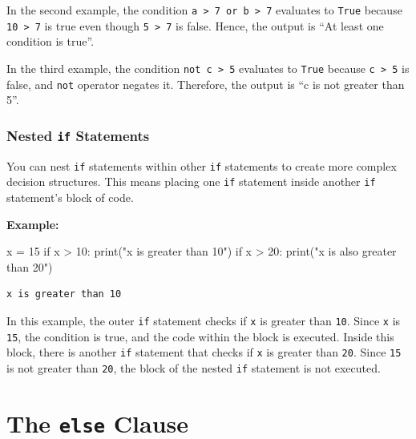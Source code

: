 \documentclass[
  letterpaper,
  DIV=11,
  numbers=noendperiod]{scrreprt}
\newenvironment{Shaded}{\begin{snugshade}}{\end{snugshade}}
\newcommand{\BuiltInTok}[1]{\textcolor[rgb]{0.00,0.23,0.31}{#1}}
\newcommand{\ControlFlowTok}[1]{\textcolor[rgb]{0.00,0.23,0.31}{#1}}
\newcommand{\DecValTok}[1]{\textcolor[rgb]{0.68,0.00,0.00}{#1}}
\newcommand{\NormalTok}[1]{\textcolor[rgb]{0.00,0.23,0.31}{#1}}
\newcommand{\OperatorTok}[1]{\textcolor[rgb]{0.37,0.37,0.37}{#1}}
\newcommand{\StringTok}[1]{\textcolor[rgb]{0.13,0.47,0.30}{#1}}
\begin{document}
In the second example, the condition
\texttt{a\ \textgreater{}\ 7\ or\ b\ \textgreater{}\ 7} evaluates to
\texttt{True} because \texttt{10\ \textgreater{}\ 7} is true even though
\texttt{5\ \textgreater{}\ 7} is false. Hence, the output is ``At least
one condition is true''.

In the third example, the condition \texttt{not\ c\ \textgreater{}\ 5}
evaluates to \texttt{True} because \texttt{c\ \textgreater{}\ 5} is
false, and \texttt{not} operator negates it. Therefore, the output is
``c is not greater than 5''.

\hypertarget{nested-if-statements}{%
\subsubsection{\texorpdfstring{Nested \texttt{if}
Statements}{Nested if Statements}}\label{nested-if-statements}}

You can nest \texttt{if} statements within other \texttt{if} statements
to create more complex decision structures. This means placing one
\texttt{if} statement inside another \texttt{if} statement's block of
code.

\textbf{Example:}

\begin{Shaded}
\begin{Highlighting}[]
\NormalTok{x }\OperatorTok{=} \DecValTok{15}
\ControlFlowTok{if}\NormalTok{ x }\OperatorTok{\textgreater{}} \DecValTok{10}\NormalTok{:}
    \BuiltInTok{print}\NormalTok{(}\StringTok{"x is greater than 10"}\NormalTok{)}
    \ControlFlowTok{if}\NormalTok{ x }\OperatorTok{\textgreater{}} \DecValTok{20}\NormalTok{:}
        \BuiltInTok{print}\NormalTok{(}\StringTok{"x is also greater than 20"}\NormalTok{)}
\end{Highlighting}
\end{Shaded}

\begin{verbatim}
x is greater than 10
\end{verbatim}

In this example, the outer \texttt{if} statement checks if \texttt{x} is
greater than \texttt{10}. Since \texttt{x} is \texttt{15}, the condition
is true, and the code within the block is executed. Inside this block,
there is another \texttt{if} statement that checks if \texttt{x} is
greater than \texttt{20}. Since \texttt{15} is not greater than
\texttt{20}, the block of the nested \texttt{if} statement is not
executed.

\hypertarget{the-else-clause}{%
\section{\texorpdfstring{The \texttt{else}
Clause}{The else Clause}}\label{the-else-clause}}
\end{document}
